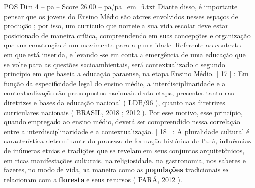 \begin{textsample}{POS Dim 4 – pa – Score 26.00 – pa/pa\_em\_6.txt}
Diante disso, é importante pensar que os jovens do Ensino Médio são atores envolvidos nesses espaços de produção ; por isso, um currículo que norteie a sua vida escolar deve estar posicionado de maneira crítica, compreendendo em suas concepções e organização que sua construção é um movimento para a pluralidade.
Referente ao contexto em que está inserida, e levando -se em conta a emergência de uma educação que se volte para as questões socioambientais, será contextualizado o segundo princípio em que baseia a educação paraense, na etapa Ensino Médio. [ 17 ] : Em função da especificidade legal do ensino médio, a interdisciplinaridade e a contextualização são pressupostos nacionais desta etapa, presentes tanto nas diretrizes e bases da educação nacional ( LDB/96 ), quanto nas diretrizes curriculares nacionais ( BRASIL, 2018 ; 2012 ).
Por esse motivo, esse princípio, quando empregado ao ensino médio, deverá ser compreendido nessa correlação entre a interdisciplinaridade e a contextualização. [ 18 ] : A pluralidade cultural é característica determinante do processo de formação histórica do Pará, influências de inúmeras etnias e tradições que se revelam em seus conjuntos arquitetônicos, em ricas manifestações culturais, na religiosidade, na gastronomia, nos saberes e fazeres, no modo de vida, na maneira como as \textbf{populações} tradicionais se relacionam com a \textbf{floresta} e seus recursos ( PARÁ, 2012 ).

\end{textsample}
